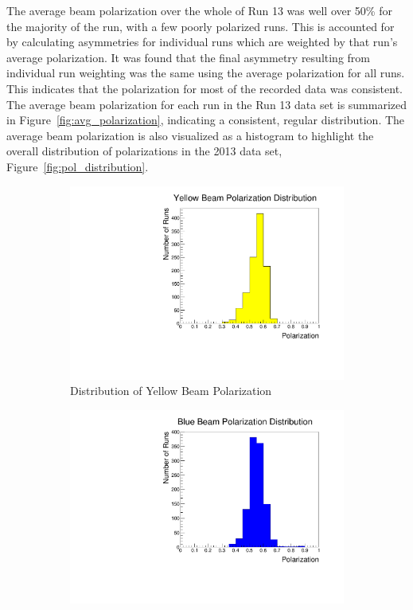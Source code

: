 The average beam polarization over the whole of Run 13 was well over 50\% for
the majority of the run, with a few poorly polarized runs. This is accounted for
by calculating asymmetries for individual runs which are weighted by that run's
average polarization. It was found that the final asymmetry resulting from
individual run weighting was the same using the average polarization for all
runs. This indicates that the polarization for most of the recorded data was
consistent.  The average beam polarization for each run in the Run 13 data set
is summarized in Figure~\ref{fig:avg_polarization}, indicating a consistent,
regular distribution. The average beam polarization is also visualized as a
histogram to highlight the overall distribution of polarizations in the 2013
data set, Figure~\ref{fig:pol_distribution}.

\begin{figure}[H]
	\centering
	\begin{subfigure}[t]{0.5\textwidth}
		\centering
		\includegraphics[width=0.95\linewidth]{./figures/yell_polarization.pdf}
		\caption{Distribution of Yellow Beam Polarization}
		\label{fig:pol_yell}
	\end{subfigure}%
  \begin{subfigure}[t]{0.5\textwidth}
		\centering
		\includegraphics[width=0.95\linewidth]{./figures/blue_polarization.pdf}

\end{subfigure}
\end{figure}
